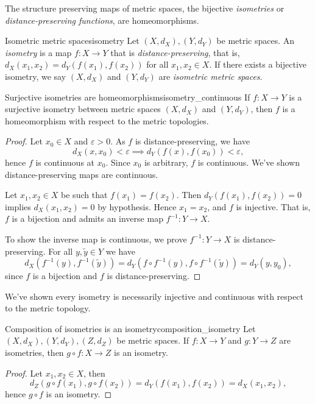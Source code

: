 The structure preserving maps of metric spaces, the bijective \emph{isometries} or \emph{distance-preserving functions}, are homeomorphisms.
\begin{definition}{Isometric metric spaces}{isometry}
    Let \((X, d_X), (Y, d_Y)\) be metric spaces. An \emph{isometry} is a map \(f : X \to Y\) that is \emph{distance-preserving}, that is, \(d_X(x_1, x_2) = d_Y(f(x_1), f(x_2))\) for all \(x_1,x_2 \in X\). If there exists a bijective isometry, we say \((X, d_X)\) and \((Y, d_Y)\) are \emph{isometric metric spaces}.
\end{definition}
\begin{proposition}{Surjective isometries are homeomorphisms}{isometry_continuous}
    If \(f: X \to Y\) is a surjective isometry between metric spaces \((X, d_X)\) and \((Y, d_Y)\), then \(f\) is a homeomorphism with respect to the metric topologies.
\end{proposition}
\begin{proof}
    Let \(x_0 \in X\) and \(\varepsilon > 0\). As \(f\) is distance-preserving, we have
    \begin{equation*}
        d_X(x, x_0) < \varepsilon \implies d_Y(f(x), f(x_0)) < \varepsilon,
    \end{equation*}
    hence \(f\) is continuous at \(x_0\). Since \(x_0\) is arbitrary, \(f\) is continuous. We've shown distance-preserving maps are continuous.

    Let \(x_1, x_2 \in X\) be such that \(f(x_1) = f(x_2)\). Then \(d_Y(f(x_1), f(x_2)) = 0\) implies \(d_X(x_1, x_2) = 0\) by hypothesis. Hence \(x_1 = x_2\), and \(f\) is injective. That is, \(f\) is a bijection and admits an inverse map \(f^{-1} : Y \to X\).

    To show the inverse map is continuous, we prove \(f^{-1} : Y \to X\) is distance-preserving. For all \(y, \tilde{y} \in Y\) we have
    \begin{equation*}
        d_X(f^{-1}(y), f^{-1}(\tilde{y})) = d_Y\left(f \circ f^{-1} (y), f \circ f^{-1} (\tilde{y})\right) = d_Y(y, y_0),
    \end{equation*}
    since \(f\) is a bijection and \(f\) is distance-preserving.
\end{proof}
\begin{remark}
    We've shown every isometry is necessarily injective and continuous with respect to the metric topology.
\end{remark}
\begin{proposition}{Composition of isometries is an isometry}{composition_isometry}
    Let \((X, d_X),(Y, d_Y),(Z, d_Z)\) be metric spaces. If \(f : X \to Y\) and \(g : Y \to Z\) are isometries, then \(g \circ f : X \to Z\) is an isometry.
\end{proposition}
\begin{proof}
    Let \(x_1, x_2 \in X\), then
    \begin{equation*}
        d_Z(g \circ f(x_1), g \circ f(x_2)) = d_Y(f(x_1), f(x_2)) = d_X(x_1, x_2),
    \end{equation*}
    hence \(g \circ f\) is an isometry.
\end{proof}

